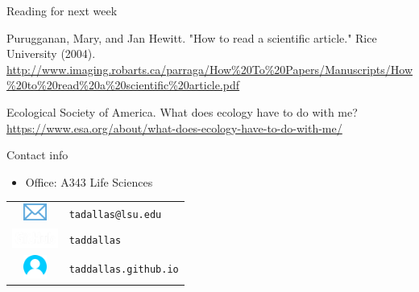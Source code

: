 \documentclass[12pt]{beamer}
\begin{document}
\begin{frame}

	\begin{flushright}
	  \Large \textcolor{boss2}{Reading for next week} 
	\end{flushright}

Purugganan, Mary, and Jan Hewitt. "How to read a scientific article." Rice University (2004). \url{http://www.imaging.robarts.ca/parraga/How%20To%20Papers/Manuscripts/How%20to%20read%20a%20scientific%20article.pdf}


Ecological Society of America. What does ecology have to do with me? \url{https://www.esa.org/about/what-does-ecology-have-to-do-with-me/}


\end{frame}











\begin{frame}

{\large \textcolor{lsu1}{Contact info}}

  \begin{itemize}
    \item \textcolor{boss1}{Office:} A343 Life Sciences
  \end{itemize}

  \begin{flushright}
    \begin{tabular}{cl}
    \includegraphics[width=0.75cm]{figs/email.png} & \texttt{tadallas@lsu.edu} \\
    \includegraphics[width=1.5cm]{figs/octocat.png} & \texttt{taddallas} \\
    \includegraphics[width=0.75cm]{figs/user.png} & \texttt{taddallas.github.io}\\
   \end{tabular}
  \end{flushright}
\end{frame}
\end{document}
